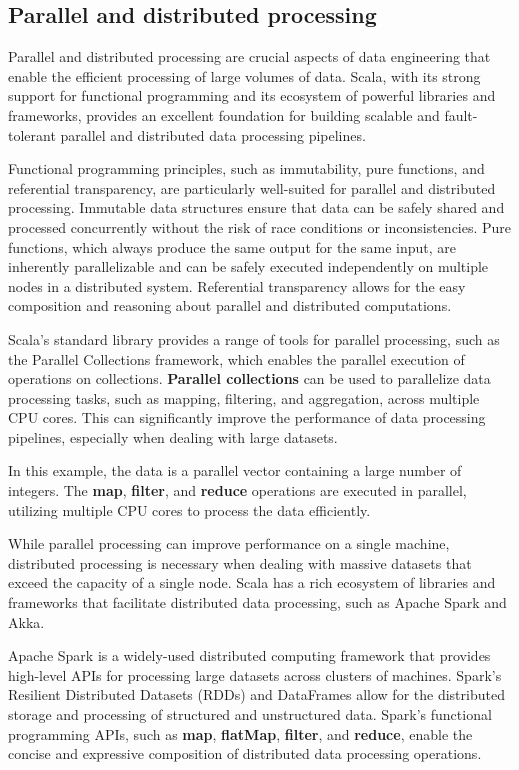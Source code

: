 \subsection{Parallel and distributed processing}

Parallel and distributed processing are crucial aspects of data engineering that enable the efficient processing of large volumes of data. Scala, with its strong support for functional programming and its ecosystem of powerful libraries and frameworks, provides an excellent foundation for building scalable and fault-tolerant parallel and distributed data processing pipelines.

Functional programming principles, such as immutability, pure functions, and referential transparency, are particularly well-suited for parallel and distributed processing. Immutable data structures ensure that data can be safely shared and processed concurrently without the risk of race conditions or inconsistencies. Pure functions, which always produce the same output for the same input, are inherently parallelizable and can be safely executed independently on multiple nodes in a distributed system. Referential transparency allows for the easy composition and reasoning about parallel and distributed computations.

Scala's standard library provides a range of tools for parallel processing, such as the Parallel Collections framework, which enables the parallel execution of operations on collections. \textbf{Parallel collections} can be used to parallelize data processing tasks, such as mapping, filtering, and aggregation, across multiple CPU cores. This can significantly improve the performance of data processing pipelines, especially when dealing with large datasets.



In this example, the data is a parallel vector containing a large number of integers. The \textbf{map}, \textbf{filter}, and \textbf{reduce} operations are executed in parallel, utilizing multiple CPU cores to process the data efficiently.

While parallel processing can improve performance on a single machine, distributed processing is necessary when dealing with massive datasets that exceed the capacity of a single node. Scala has a rich ecosystem of libraries and frameworks that facilitate distributed data processing, such as Apache Spark and Akka.

Apache Spark is a widely-used distributed computing framework that provides high-level APIs for processing large datasets across clusters of machines. Spark's Resilient Distributed Datasets (RDDs) and DataFrames allow for the distributed storage and processing of structured and unstructured data. Spark's functional programming APIs, such as \textbf{map}, \textbf{flatMap}, \textbf{filter}, and \textbf{reduce}, enable the concise and expressive composition of distributed data processing operations.

